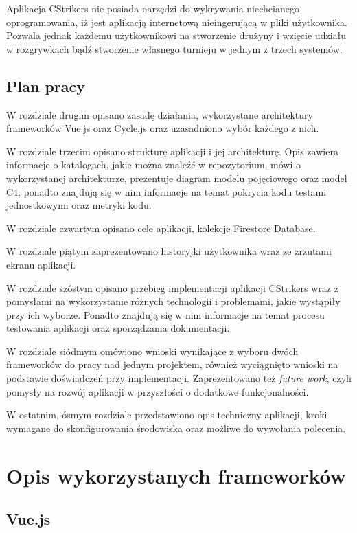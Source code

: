 \documentclass[shortabstract]{iithesis}
\theoremstyle{definition} \newtheorem{definition}{Definicja}[]
\theoremstyle{remark} \newtheorem{remark}[definition]{Observation}
\theoremstyle{plain} \newtheorem{theorem}[definition]{Theorem}
\theoremstyle{plain} \newtheorem{lemma}[definition]{Lemma}
\begin{document}
Aplikacja CStrikers nie posiada narzędzi do wykrywania niechcianego oprogramowania, iż jest aplikacją internetową nieingerującą w pliki użytkownika. Pozwala jednak każdemu użytkownikowi na stworzenie drużyny i wzięcie udziału w rozgrywkach bądź stworzenie własnego turnieju w jednym z trzech systemów.

\section{Plan pracy}
W rozdziale drugim opisano zasadę działania, wykorzystane architektury frameworków Vue.js oraz Cycle.js oraz uzasadniono wybór każdego z nich.

W rozdziale trzecim opisano strukturę aplikacji i jej architekturę. Opis zawiera informacje o katalogach, jakie można znaleźć w repozytorium, mówi o wykorzystanej architekturze, prezentuje diagram modelu pojęciowego oraz model C4, ponadto znajdują się w nim informacje na temat pokrycia kodu testami jednostkowymi oraz metryki kodu.

W rozdziale czwartym opisano cele aplikacji, kolekcje Firestore Database.

W rozdziale piątym zaprezentowano historyjki użytkownika wraz ze zrzutami ekranu aplikacji.

W rozdziale szóstym opisano przebieg implementacji aplikacji CStrikers wraz z pomysłami na wykorzystanie różnych technologii i problemami, jakie wystąpiły przy ich wyborze. Ponadto znajdują się w nim informacje na temat procesu testowania aplikacji oraz sporządzania dokumentacji.

W rozdziale siódmym omówiono wnioski wynikające z wyboru dwóch frameworków do pracy nad jednym projektem, również wyciągnięto wnioski na podstawie doświadczeń przy implementacji. Zaprezentowano też \textit{future work}, czyli pomysły na rozwój aplikacji w przyszłości o dodatkowe funkcjonalności.

W ostatnim, ósmym rozdziale przedstawiono opis techniczny aplikacji, kroki wymagane do skonfigurowania środowiska oraz możliwe do wywołania polecenia.



\chapter{Opis wykorzystanych frameworków}
\section{Vue.js}
\end{document}
